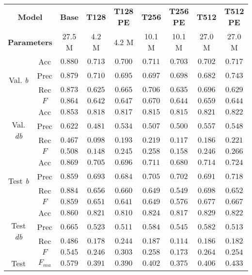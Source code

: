 \begin{tabular}{cc|ccccccc}
    \multicolumn{2}{c|}{\textbf{Model}} & \textbf{Base} & \textbf{T128} & \textbf{T128 PE} & \textbf{T256} & \textbf{T256 PE} & \textbf{T512} & \textbf{T512 PE}\\
    \multicolumn{2}{c|}{\textbf{Parameters}} & 27.5 M & 4.2 M & 4.2 M & 10.1 M & 10.1 M & 27.0 M & 27.0 M \\\hline
    \multirow{4}{*}{Val. \emph{b}}  & Acc      & $\mathbf{0.880}$ & $0.713$ & $0.700$ & $0.711$ & $0.703$ & $0.702$ & $0.717$ \\
    & Prec     & $\mathbf{0.879}$ & $0.710$ & $0.695$ & $0.697$ & $0.698$ & $0.682$ & $0.743$ \\
    & Rec      & $\mathbf{0.873}$ & $0.625$ & $0.665$ & $0.706$ & $0.635$ & $0.696$ & $0.629$ \\
    & $F$      & $\mathbf{0.864}$ & $0.642$ & $0.647$ & $0.670$ & $0.644$ & $0.659$ & $0.644$ \\\hline
    \multirow{4}{*}{Val. \emph{db}} & Acc      & $\mathbf{0.853}$ & $0.818$ & $0.817$ & $0.815$ & $0.815$ & $0.821$ & $0.822$ \\
    & Prec     & $\mathbf{0.622}$ & $0.481$ & $0.534$ & $0.507$ & $0.500$ & $0.557$ & $0.548$ \\
    & Rec      & $\mathbf{0.467}$ & $0.098$ & $0.193$ & $0.219$ & $0.117$ & $0.186$ & $0.221$ \\
    & $F$      & $\mathbf{0.508}$ & $0.148$ & $0.245$ & $0.258$ & $0.158$ & $0.246$ & $0.266$ \\\hline
    \multirow{4}{*}{Test \emph{b}}  & Acc      & $\mathbf{0.869}$ & $0.705$ & $0.696$ & $0.711$ & $0.680$ & $0.714$ & $0.724$ \\
    & Prec     & $\mathbf{0.859}$ & $0.693$ & $0.684$ & $0.705$ & $0.702$ & $0.691$ & $0.718$ \\
    & Rec      & $\mathbf{0.884}$ & $0.656$ & $0.660$ & $0.649$ & $0.549$ & $0.698$ & $0.652$ \\
    & $F$      & $\mathbf{0.859}$ & $0.651$ & $0.641$ & $0.649$ & $0.576$ & $0.677$ & $0.667$ \\\hline
    \multirow{4}{*}{Test \emph{db}} & Acc      & $\mathbf{0.860}$ & $0.821$ & $0.810$ & $0.824$ & $0.817$ & $0.829$ & $0.822$ \\
    & Prec     & $\mathbf{0.665}$ & $0.523$ & $0.511$ & $0.584$ & $0.545$ & $0.582$ & $0.513$ \\
    & Rec      & $\mathbf{0.486}$ & $0.178$ & $0.244$ & $0.187$ & $0.114$ & $0.186$ & $0.182$ \\
    & $F$      & $\mathbf{0.545}$ & $0.246$ & $0.303$ & $0.258$ & $0.173$ & $0.264$ & $0.254$ \\\hline
    \multirow{1}{*}{Test}           & $F_{ma}$ & $\mathbf{0.579}$ & $0.391$ & $0.390$ & $0.402$ & $0.375$ & $0.406$ & $0.433$ \\
\end{tabular}
